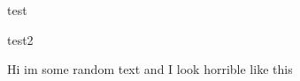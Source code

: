 \documentclass[ngerman]{article}
\begin{document}
{test}

{test2}

Hi im some random text and I look horrible like this
\end{document}
